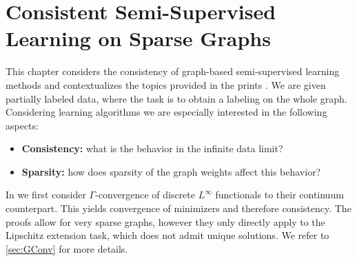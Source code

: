 \chapter{Consistent Semi-Supervised Learning on Sparse Graphs}\label{ch:SSL}

This chapter considers the consistency of graph-based semi-supervised learning methods and contextualizes the topics provided in the prints \cite{roith2022continuum, bungert2021uniform}. We are given partially labeled data, where the task is to obtain a labeling on the  whole graph. Considering learning algorithms we are especially interested in the following aspects:
%
\begin{itemize}
\item \textbf{Consistency:} what is the behavior in the infinite data limit?
\item \textbf{Sparsity:} how does sparsity of the graph weights affect this behavior?
\end{itemize}
%
%
%
\begin{center}%
\end{center}
%
In \cite{roith2022continuum} we first consider $\Gamma$-convergence of discrete $L^\infty$ functionals to their continuum counterpart. This yields convergence of minimizers and therefore consistency. The proofs allow for very sparse graphs, however they only directly apply to the Lipschitz extension task, which does not admit unique solutions. We refer to \cref{sec:GConv} for more details.

